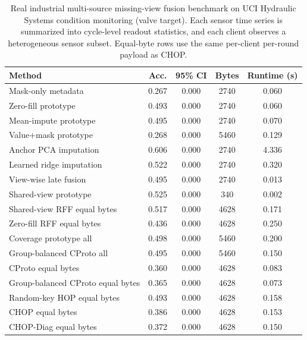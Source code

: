 \begin{table}[t]
\centering
\caption{Real industrial multi-source missing-view fusion benchmark on UCI Hydraulic Systems condition monitoring (valve target). Each sensor time series is summarized into cycle-level readout statistics, and each client observes a heterogeneous sensor subset. Equal-byte rows use the same per-client per-round payload as CHOP.}
\label{tab:if-hydraulic-fusion}
\scriptsize
\setlength{\tabcolsep}{3pt}
\renewcommand{\arraystretch}{0.94}
\begin{tabular}{lcccc}
\toprule
Method & Acc. & 95\% CI & Bytes & Runtime (s) \\
\midrule
Mask-only metadata & 0.267 & 0.000 & 2740 & 0.060 \\
Zero-fill prototype & 0.493 & 0.000 & 2740 & 0.060 \\
Mean-impute prototype & 0.495 & 0.000 & 2740 & 0.070 \\
Value+mask prototype & 0.268 & 0.000 & 5460 & 0.129 \\
Anchor PCA imputation & 0.606 & 0.000 & 2740 & 4.336 \\
Learned ridge imputation & 0.522 & 0.000 & 2740 & 0.320 \\
View-wise late fusion & 0.495 & 0.000 & 2740 & 0.013 \\
Shared-view prototype & 0.525 & 0.000 & 340 & 0.002 \\
Shared-view RFF equal bytes & 0.517 & 0.000 & 4628 & 0.171 \\
Zero-fill RFF equal bytes & 0.436 & 0.000 & 4628 & 0.250 \\
Coverage prototype all & 0.498 & 0.000 & 5460 & 0.200 \\
Group-balanced CProto all & 0.495 & 0.000 & 5460 & 0.150 \\
CProto equal bytes & 0.360 & 0.000 & 4628 & 0.083 \\
Group-balanced CProto equal bytes & 0.365 & 0.000 & 4628 & 0.073 \\
Random-key HOP equal bytes & 0.493 & 0.000 & 4628 & 0.158 \\
CHOP equal bytes & 0.386 & 0.000 & 4628 & 0.153 \\
CHOP-Diag equal bytes & 0.372 & 0.000 & 4628 & 0.150 \\
\bottomrule
\end{tabular}
\end{table}
